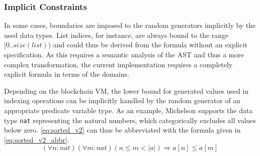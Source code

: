 \subsubsection{Implicit Constraints}
In some cases, boundaries are imposed to the random generators implicitly by the used data types. List indices, for instance, are always bound to the range $[0.. size(list))$ and could thus be derived from the formula without an explicit specification. As this requires a semantic analysis of the AST and thus a more complex transformation, the current implementation requires a completely explicit formula in terms of the domains. 

Depending on the blockchain VM, the lower bound for generated values used in indexing operations can be implicitly handled by the random generator of an appropriate predicate variable type. As an example, Michelson supports the data type \texttt{nat} representing the natural numbers, which categorically excludes all values below zero. \eqref{eq:sorted_v2} can thus be abbreviated with the formula given in \eqref{eq:sorted_v2_abbr}.
\begin{equation}\label{eq:sorted_v2_abbr}
	(\forall n : nat)(\forall m : nat) (n \le m < |a|) \Rightarrow a[n] \leq a[m]
\end{equation}
